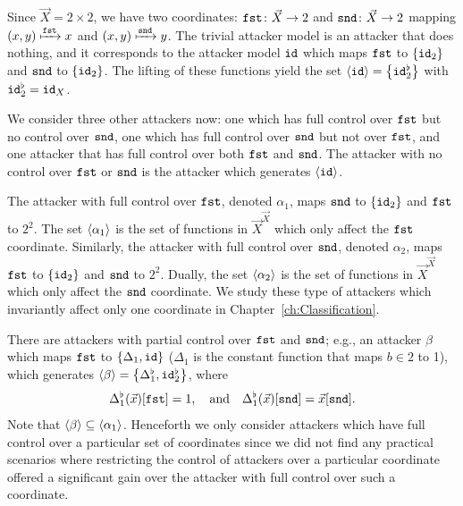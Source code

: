 \begin{example}
\label{ex:Latent:ExampleAttacker}
    Since $\vec{X}=2\times 2$, we have two coordinates: $\mathtt{\texttt{fst}}\colon \vec{X}\rightarrow 2$ and $\mathtt{\texttt{snd}}\colon \vec{X}\rightarrow 2$ mapping $(x,y)\xmapsto{\mathtt{\texttt{fst}}}x$ and $(x,y)\xmapsto{\mathtt{\texttt{snd}}}y$. The trivial attacker model is an attacker that does nothing, and it corresponds to the attacker model ${\texttt{id}}$ which maps $\mathtt{\texttt{fst}}$ to $\left\{{\texttt{id}}_2\right\}$ and $\mathtt{\texttt{snd}}$ to $\left\{{\texttt{id}}_2\right\}$. The lifting of these functions yield the set ${{\left<{\texttt{id}}\right>}}=\left\{{\texttt{id}}_{2}^\flat\right\}$ with ${\texttt{id}}_{2}^\flat={\texttt{id}}_X$.

    We consider three other attackers now: one which has full control over $\mathtt{\texttt{fst}}$ but no control over $\mathtt{\texttt{snd}}$, one which has full control over $\mathtt{\texttt{snd}}$ but not over $\mathtt{\texttt{fst}}$, and one attacker that has full control over both $\mathtt{\texttt{fst}}$ and $\mathtt{\texttt{snd}}$. The attacker with no control over $\mathtt{\texttt{fst}}$ or $\mathtt{\texttt{snd}}$ is the attacker which generates ${{\left<{\texttt{id}}\right>}}$. 

    The attacker with full control over $\mathtt{\texttt{fst}}$, denoted $\alpha_1$, maps $\mathtt{\texttt{snd}}$ to $\left\{{\texttt{id}}_2\right\}$ and $\mathtt{\texttt{fst}}$ to $2^2$. The set ${{\left<\alpha_1\right>}}$ is the set of functions in $\vec{X}^{\vec{X}}$ which only affect the $\mathtt{\texttt{fst}}$ coordinate. Similarly, the attacker with full control over $\mathtt{\texttt{snd}}$, denoted $\alpha_2$, maps $\mathtt{\texttt{fst}}$ to $\left\{{\texttt{id}}_2\right\}$ and $\mathtt{\texttt{snd}}$ to $2^2$. Dually, the set ${{\left<\alpha_2\right>}}$ is the set of functions in $\vec{X}^{\vec{X}}$ which only affect the $\mathtt{\texttt{snd}}$ coordinate. We study these type of attackers which invariantly affect only one coordinate in Chapter~\ref{ch:Classification}. 

    There are attackers with partial control over $\mathtt{\texttt{fst}}$ and $\mathtt{\texttt{snd}}$; e.g., an attacker $\beta$ which maps $\mathtt{\texttt{fst}}$ to $\left\{\Delta_1, {\texttt{id}}\right\}$ ($\Delta_1$ is the constant function that maps $b\in 2$ to 1), which generates ${{\left<\beta\right>}}=\left\{\Delta^\flat_1, {\texttt{id}}_2^\flat\right\}$, where
    \begin{align*}
        \Delta^\flat_1(\vec{x})[\mathtt{\texttt{fst}}]=1,\quad\text{and}\quad \Delta^\flat_1(\vec{x})[\mathtt{\texttt{snd}}]=\vec{x}[\mathtt{\texttt{snd}}].
    \end{align*}
    Note that ${{\left<\beta\right>}}\subseteq{{\left<\alpha_1\right>}}$. Henceforth we only consider attackers which have full control over a particular set of coordinates since we did not find any practical scenarios where restricting the control of attackers over a particular coordinate offered a significant gain over the attacker with full control over such a coordinate.


\end{example}
